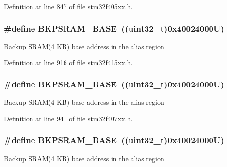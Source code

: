 Definition at line 847 of file stm32f405xx.\+h.

\subsubsection[{\texorpdfstring{B\+K\+P\+S\+R\+A\+M\+\_\+\+B\+A\+SE}{BKPSRAM_BASE}}]{\setlength{\rightskip}{0pt plus 5cm}\#define B\+K\+P\+S\+R\+A\+M\+\_\+\+B\+A\+SE~((uint32\+\_\+t)0x40024000\+U)}\hypertarget{group___peripheral__registers__structures_ga52e57051bdf8909222b36e5408a48f32}{}\label{group___peripheral__registers__structures_ga52e57051bdf8909222b36e5408a48f32}
Backup S\+R\+A\+M(4 K\+B) base address in the alias region 

Definition at line 916 of file stm32f415xx.\+h.

\subsubsection[{\texorpdfstring{B\+K\+P\+S\+R\+A\+M\+\_\+\+B\+A\+SE}{BKPSRAM_BASE}}]{\setlength{\rightskip}{0pt plus 5cm}\#define B\+K\+P\+S\+R\+A\+M\+\_\+\+B\+A\+SE~((uint32\+\_\+t)0x40024000\+U)}\hypertarget{group___peripheral__registers__structures_ga52e57051bdf8909222b36e5408a48f32}{}\label{group___peripheral__registers__structures_ga52e57051bdf8909222b36e5408a48f32}
Backup S\+R\+A\+M(4 K\+B) base address in the alias region 

Definition at line 941 of file stm32f407xx.\+h.

\subsubsection[{\texorpdfstring{B\+K\+P\+S\+R\+A\+M\+\_\+\+B\+A\+SE}{BKPSRAM_BASE}}]{\setlength{\rightskip}{0pt plus 5cm}\#define B\+K\+P\+S\+R\+A\+M\+\_\+\+B\+A\+SE~((uint32\+\_\+t)0x40024000\+U)}\hypertarget{group___peripheral__registers__structures_ga52e57051bdf8909222b36e5408a48f32}{}\label{group___peripheral__registers__structures_ga52e57051bdf8909222b36e5408a48f32}
Backup S\+R\+A\+M(4 K\+B) base address in the alias region 

